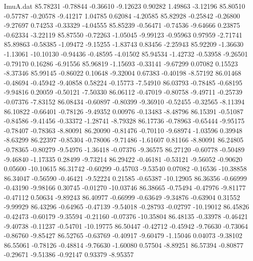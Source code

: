 \begin{filecontents}{ImuA.dat}
  85.78231   -0.78844   -0.36610   -9.12623    0.90282    1.49863   -3.12196
  85.80510   -0.57787   -0.20578   -9.41217    1.04785    0.62084   -4.20585
  85.82928   -0.25842   -0.26800   -9.27697    0.74253   -0.33329   -4.04555
  85.85239   -0.56471   -0.74536   -9.64666    0.23875   -0.62334   -3.22119
  85.87550   -0.72263   -1.05045   -9.99123   -0.95963    0.97959   -2.71741
  85.89863   -0.58385   -1.09472   -9.15255   -1.83743    0.83456   -2.25943
  85.92209   -1.36630   -1.13061  -10.10130   -0.94436   -0.48595   -4.01502
  85.94534   -1.42732   -0.53958   -9.26501   -0.79170    0.16286   -6.91556
  85.96819   -1.15693   -0.33141   -9.67299    0.07082    0.15523   -8.37346
  85.99145   -0.86022    0.10648   -9.32004    0.67383   -0.40198   -8.57192
  86.01468   -0.48694   -0.45942   -9.40858    0.58224   -0.15773   -7.54910
  86.03793   -0.78485   -0.68195   -9.94816    0.20059   -0.50121   -7.50330
  86.06112   -0.47019   -0.80758   -9.49711   -0.25739   -0.07376   -7.83152
  86.08434   -0.60897   -0.80399   -9.36910   -0.52455   -0.32565   -8.11394
  86.10822   -0.66401   -0.78126   -9.49352    0.00976   -0.13483   -8.48796
  86.15391   -0.51087   -0.84586   -9.41456   -0.33372   -1.28741   -8.79328
  86.17736   -0.78963   -0.65444   -9.95175   -0.78407   -0.78363   -8.80091
  86.20090   -0.81476   -0.70110   -9.68974   -1.03596    0.39948   -8.63299
  86.22397   -0.85304   -0.78006   -9.71486   -1.61607    0.81166   -8.80091
  86.24805   -0.78365   -0.80279   -9.54976   -1.36418   -0.07376   -9.36575
  86.27120   -0.60778   -0.50489   -9.46840   -1.17335    0.28499   -9.73214
  86.29422   -0.46181   -0.53121   -9.56052   -0.90620    0.05600  -10.10615
  86.31742   -0.60299   -0.45703   -9.53540    0.07082   -0.16536  -10.38858
  86.34047   -0.56590   -0.46421   -9.52224    0.21585   -0.65387  -10.12905
  86.36356   -0.66999   -0.43190   -9.98166    0.30745   -0.01270  -10.03746
  86.38665   -0.75494   -0.47976   -9.81177   -0.47112    0.50634   -9.89243
  86.40977   -0.66999   -0.63649   -9.34876   -0.63904    0.31552   -9.99929
  86.43296   -0.64965   -0.47139   -9.54018   -0.28793   -0.02797  -10.19012
  86.45826   -0.42473   -0.60179   -9.35594   -0.21160   -0.07376  -10.35804
  86.48135   -0.33978   -0.46421   -9.40738   -0.11237   -0.54701  -10.19775
  86.50447   -0.42712   -0.45942   -9.76630   -0.73064   -0.86760   -9.85427
  86.52765   -0.63769   -0.40917   -9.60479   -1.15046    0.04073   -9.38102
  86.55061   -0.78126   -0.48814   -9.76630   -1.60080    0.57504   -8.89251
  86.57394   -0.80877   -0.29671   -9.51386   -0.92147    0.93379   -8.95357

\end{filecontents}
